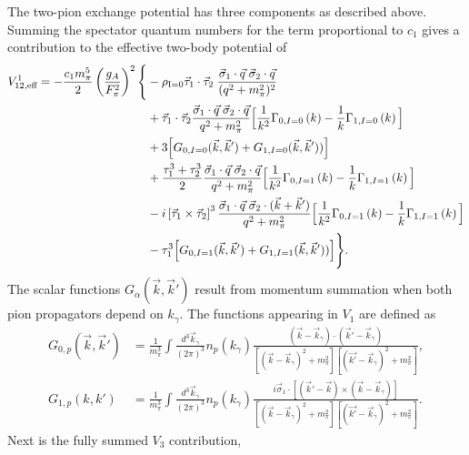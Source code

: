 The two-pion exchange potential has three components as described above. Summing the spectator quantum numbers for the term proportional to $c_1$ gives a contribution to the effective two-body potential of
\begin{equation}\begin{split}
 V_{12,\text{eff}}^1 = - \frac{c_1 m_\pi^5}{2} \left(\frac{g_A}{F_\pi^2}\right)^2
 \Bigg\{& -\rho_{\text{I}=0} \vec{\tau}_1\cdot\vec{\tau}_2 \; \frac{\vec{\sigma}_1\cdot\vec{q}\;\vec{\sigma}_2\cdot\vec{q}}{(q^2+m_\pi^2)^2} \\
 &+ \vec{\tau}_1\cdot\vec{\tau}_2 \frac{\vec{\sigma}_1 \cdot \vec{q}\; \vec{\sigma}_2\cdot \vec{q}}{q^2+m_\pi^2}\Big[\frac{1}{k^2}\Gamma_{0, I=0}\left(k\right)-\frac{1}{k}\Gamma_{1, I=0}\left(k\right)\Big] \\
 & +3 \Big[ G_{0,I=0}(\vec{k},\vec{k}')+G_{1,I=0}(\vec{k},\vec{k}')) \Big] \\
 &+\frac{\tau_1^3+\tau_2^3}{2} \frac{\vec{\sigma}_1 \cdot \vec{q}\; \vec{\sigma}_2\cdot \vec{q}}{q^2+m_\pi^2}\Big[\frac{1}{k^2}\Gamma_{0, I=1}\left(k\right)-\frac{1}{k}\Gamma_{1, I=1}\left(k\right)\Big] \\
 &- i \left[\vec{\tau}_1\times\vec{\tau}_2\right]^3  \frac{\vec{\sigma}_1 \cdot \vec{q}\; \vec{\sigma}_2\cdot (\vec{k}+\vec{k}')}{q^2+m_\pi^2}\Big[\frac{1}{k^2}\Gamma_{0, I=1}\left(k\right)-\frac{1}{k}\Gamma_{1, I=1}\left(k\right)\Big]  \\
 & -\tau_1^3 \Big[ G_{0,I=1}(\vec{k},\vec{k}')+G_{1,I=1}(\vec{k},\vec{k}')) \Big] \Bigg\}.
 \end{split}
 \end{equation}
The scalar functions $G_\alpha(\vec{k},\vec{k}')$ result from momentum summation when both pion propagators depend on $k_\gamma$. The functions appearing in $V_1$ are defined as
\begin{align}
G_{0,p}(\vec{k},\vec{k}') & = \frac{1}{m_\pi^3}\int\frac{d^3\vec{k}_\gamma}{(2\pi)^3} n_{p}(k_\gamma) \frac{(\vec{k}-\vec{k}_\gamma)\cdot(\vec{k}'-\vec{k}_\gamma) }{[(\vec{k}-\vec{k}_\gamma)^2+m_\pi^2][(\vec{k'}-\vec{k}_\gamma)^2+m_\pi^2]}, \\
%
G_{1,p}(k,k') & = \frac{1}{m_\pi^3}\int\frac{d^3\vec{k}_\gamma}{(2\pi)^3} n_{p}(k_\gamma) \frac{i\vec{\sigma}_1\cdot\left[(\vec{k}'-\vec{k})\times(\vec{k}-\vec{k}_\gamma)\right] }{[(\vec{k}-\vec{k}_\gamma)^2+m_\pi^2][(\vec{k'}-\vec{k}_\gamma)^2+m_\pi^2]}.
\end{align}
Next is the fully summed $V_3$ contribution,

